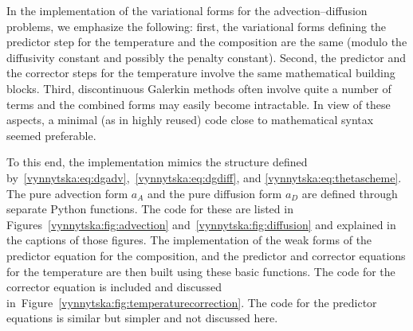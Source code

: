 In the implementation of the variational forms for the
advection--diffusion problems, we emphasize the following:
first, the variational forms defining the predictor step for
the temperature and the composition are the same (modulo the
diffusivity constant and possibly the penalty constant).  Second, the
predictor and the corrector steps for the temperature involve the same
mathematical building blocks. Third, discontinuous Galerkin methods
often involve quite a number of terms and the combined forms may
easily become intractable. In view of these aspects, a minimal (as in
highly reused) code close to mathematical syntax seemed preferable.

To this end, the implementation mimics the structure defined
by~\eqref{vynnytska:eq:dgadv},~\eqref{vynnytska:eq:dgdiff}, and
\eqref{vynnytska:eq:thetascheme}. The pure advection form $a_A$ and
the pure diffusion form $a_D$ are defined through separate Python
functions. The code for these are listed in
Figures~\ref{vynnytska:fig:advection}
and~\ref{vynnytska:fig:diffusion} and explained in the captions of
those figures. The implementation of the weak forms of the predictor
equation for the composition, and the predictor and corrector
equations for the temperature are then built using these basic functions. The
code for the corrector equation is included and discussed
in~Figure~\ref{vynnytska:fig:temperaturecorrection}. The code for the
predictor equations is similar but simpler and not discussed
here.

